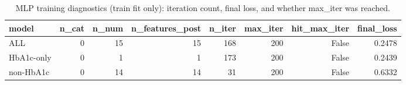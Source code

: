 \begin{table}[H]
\begin{center}
\begin{tabular}{lrrrrrrr}
\toprule
model & n_cat & n_num & n_features_post & n_iter & max_iter & hit_max_iter & final_loss \\
\midrule
ALL & 0 & 15 & 15 & 168 & 200 & False & 0.2478 \\
HbA1c-only & 0 & 1 & 1 & 173 & 200 & False & 0.2439 \\
non-HbA1c & 0 & 14 & 14 & 31 & 200 & False & 0.6332 \\
\bottomrule
\end{tabular}
\end{center}
\vspace{-5pt}
\caption{MLP training diagnostics (train fit only): iteration count, final loss, and whether max_iter was reached.}
\label{tab:mlp_train_fit_summary}
\end{table}
